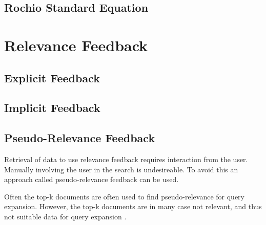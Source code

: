 \subsection{Rochio Standard Equation}

\section{Relevance Feedback}

\subsection{Explicit Feedback}

\subsection{Implicit Feedback}

\subsection{Pseudo-Relevance Feedback}
Retrieval of data to use relevance feedback requires interaction from the user.
Manually involving the user in the search is undesireable.
To avoid this an approach called pseudo-relevance feedback can be used.

Often the top-k documents are often used to find pseudo-relevance for query expansion.
However, the top-k documents are in many case not relevant, and thus not suitable data for query expansion \cite{pseudo-relevance-invalid}.
